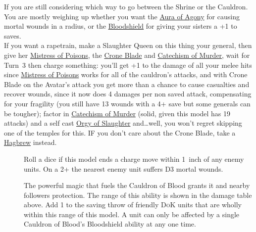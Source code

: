 If you are still considering which way to go between the Shrine or the
Cauldron. You are mostly weighing up whether you want the
\hyperref[aura-of-agony]{Aura of Agony} for causing mortal wounds in a radius,
or the \hyperref[bloodshield]{Bloodshield} for giving your sisters a +1 to
saves.\\

If you want a rapetrain, make a Slaughter Queen on this thing your general,
then give her 
\hyperref[mistress-of-poisons]{Mistress of Poisons}, the
\hyperref[crone-blade]{Crone Blade} and
\hyperref[catechism-of-murder]{Catechism of Murder}, wait for Turn~3 then
charge something: you'll get +1 to the damage of all your melee hits since
\hyperref[mistress-of-poisons]{Mistress of Poisons} works for all of the cauldron's attacks, and with Crone
Blade on the Avatar's attack you get more than a chance to cause casualties and
recover wounds, since it now does 4 damages per non saved attack, compensating
for your fragility (you still have 13 wounds with a 4+ save but some generals
can be tougher); factor in \hyperref[catechism-of-murder]{Catechism of Murder}
(solid, given this model has 19 attacks) and a self cast
\hyperref[orgy-of-slaughter]{Orgy of Slaughter} and\ldots well, you won't
regret skipping one of the temples for this. IF you don't care about the Crone
Blade, take a \hyperref[hagbrew]{Hagbrew} instead.\\

\begin{description}
    \item [] Roll a dice if this model
        ends a charge move within 1~inch of any enemy units. On a 2+ the
        nearest enemy unit suffers D3 mortal wounds.
    \item [] The powerful magic that fuels
        the Cauldron of Blood grants it and nearby followers protection. The
        range of this ability is shown in the damage table above. Add 1 to the
        saving throw of friendly \textsc{DoK} units that are wholly
        within this range of this model. A unit can only be affected by
        a single Cauldron of Blood’s Bloodshield ability at any one time.
\end{description}


